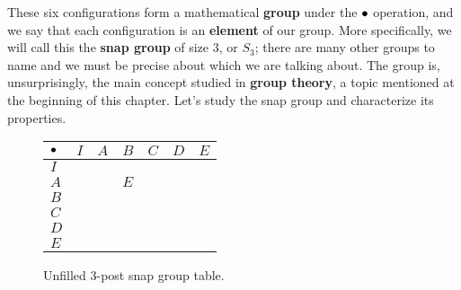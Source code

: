 \documentclass[../gatm.tex]{subfiles}
\begin{document}
These six configurations form a mathematical \textbf{group} under the $\bullet$ operation, and we say that each configuration is an \textbf{element} of our group.
More specifically, we will call this the \textbf{snap group} of size $3$, or $S_3$; there are many other groups to name and we must be precise about which we are talking about.
The group is, unsurprisingly, the main concept studied in \textbf{group theory}, a topic mentioned at the beginning of this chapter.
Let's study the snap group and characterize its properties.


\begin{figure}
	\begin{center}
		\begin{tabular}{C|C|C|C|C|C|C|}
			$\bullet$ & $I$ & $A$ & $B$ & $C$ & $D$ & $E$ \\ \hline
			$I$     &     &     &     &     &     &     \\ \hline
			$A$     &     &     & $E$ &     &     &     \\ \hline
			$B$     &     &     &     &     &     &     \\ \hline
			$C$     &     &     &     &     &     &     \\ \hline
			$D$     &     &     &     &     &     &     \\ \hline
			$E$     &     &     &     &     &     &     \\ \hline
		\end{tabular}
	\end{center}
	\caption{Unfilled $3$-post snap group table.}
	\label{fig:sbstable}
\end{figure}
\end{document}
